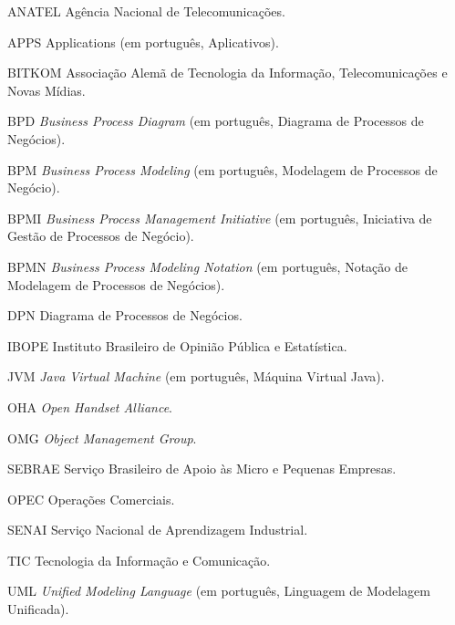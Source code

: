 
\begin{siglas}
  \item[ANATEL] Agência Nacional de Telecomunicações.
  \item[APPS] Applications (em português, Aplicativos).
  \item[BITKOM] Associação Alemã de Tecnologia da Informação, Telecomunicações e Novas Mídias.
  \item[BPD] \textit{Business Process Diagram} (em português, Diagrama de Processos de Negócios).
  \item[BPM] \textit{Business Process Modeling} (em português, Modelagem de Processos de Negócio).
  \item[BPMI] \textit{Business Process Management Initiative} (em português, Iniciativa de Gestão de Processos de Negócio).
  \item[BPMN] \textit{Business Process Modeling Notation} (em português, Notação de Modelagem de Processos de Negócios).
  \item[DPN] Diagrama de Processos de Negócios.
  \item[IBOPE] Instituto Brasileiro de Opinião Pública e Estatística.
  \item[JVM] \textit{Java Virtual Machine} (em português, Máquina Virtual Java).
  \item[OHA] \textit{Open Handset Alliance}.
  \item[OMG] \textit{Object Management Group}.
  \item[SEBRAE] Serviço Brasileiro de Apoio às Micro e Pequenas Empresas.
  \item[OPEC] Operações Comerciais.
  \item[SENAI] Serviço Nacional de Aprendizagem Industrial.
  \item[TIC] Tecnologia da Informação e Comunicação.
  \item[UML] \textit{Unified Modeling Language} (em português, Linguagem de Modelagem Unificada).
   
\end{siglas}

